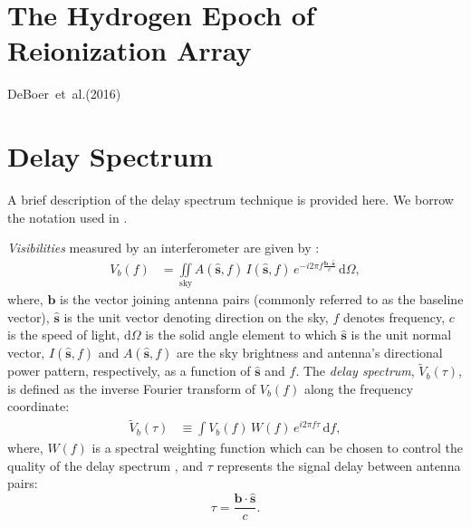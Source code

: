\documentclass[preprint2,iop,numberedappendix,twocolappendix,appendixfloats]{emulateapj}
\newcommand{\dif}{\mathrm{d}}
\begin{document}
\section{The Hydrogen Epoch of Reionization Array}\label{sec:HERA}

DeBoer~et~al.(2016)

\section{Delay Spectrum}\label{sec:delay-spectrum}

A brief description of the delay spectrum technique \citep{par12a,par12b} is provided here. We borrow the notation used in \citet{thy15a}. 

{\it Visibilities} measured by an interferometer are given by \citep{van34,zer38,tho01}:
\begin{align}\label{eqn:obsvis}
  V_b(f) &= \iint\limits_\textrm{sky} A(\hat{\boldsymbol{s}},f)\,I(\hat{\boldsymbol{s}},f)\,e^{-i2\pi f\frac{\boldsymbol{b}\cdot\hat{\boldsymbol{s}}}{c}}\,\dif\Omega,
\end{align}
where, $\boldsymbol{b}$ is the vector joining antenna pairs (commonly referred to as the baseline vector), $\hat{\boldsymbol{s}}$ is the unit vector denoting direction on the sky, $f$ denotes frequency, $c$ is the speed of light, $\dif\Omega$ is the solid angle element to which $\hat{\boldsymbol{s}}$ is the unit normal vector, $I(\hat{\boldsymbol{s}},f)$ and $A(\hat{\boldsymbol{s}},f)$ are the sky brightness and antenna's directional power pattern, respectively, as a function of $\hat{\boldsymbol{s}}$ and $f$. The {\it delay spectrum}, $\tilde{V}_b(\tau)$, is defined as the inverse Fourier transform of $V_b(f)$ along the frequency coordinate:
\begin{align}\label{eqn:delay-transform}
  \tilde{V}_b(\tau) &\equiv \int V_b(f)\,W(f)\,e^{i2\pi f\tau}\,\dif f,
\end{align}
where, $W(f)$ is a spectral weighting function which can be chosen to control the quality of the delay spectrum \citep{ved12,thy13}, and $\tau$ represents the signal delay between antenna pairs:
\begin{equation}\label{eqn:delay}
  \tau = \frac{\boldsymbol{b}\cdot\hat{\boldsymbol{s}}}{c}.
\end{equation}
\end{document}
